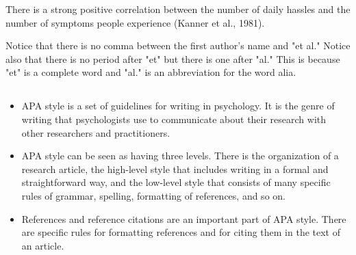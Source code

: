 \begin{kframe}
There is a strong positive correlation between the number of daily hassles and the number of symptoms people experience (Kanner et al., 1981).

\end{kframe}

Notice that there is no comma between the first author's name and "et al." Notice also that there is no period after "et" but there is one after "al." This is because "et" is a complete word and "al." is an abbreviation for the word alia.


\subsection{}
\begin{fullwidth}
\begin{itemize}
\item APA style is a set of guidelines for writing in psychology. It is the genre of writing that psychologists use to communicate about their research with other researchers and practitioners.

\item APA style can be seen as having three levels. There is the organization of a research article, the
high-level style that includes writing in a formal and straightforward way, and the low-level style
that consists of many specific rules of grammar, spelling, formatting of references, and so on.

\item References and reference citations are an important part of APA style. There are specific rules for
formatting references and for citing them in the text of an article.

\end{itemize}
\end{fullwidth}

 

